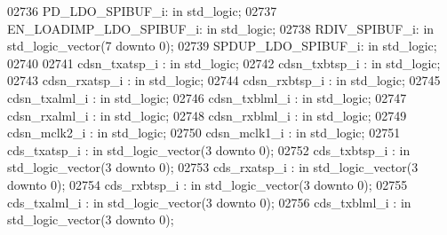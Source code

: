 \begin{DoxyCode}
02736     PD\_LDO\_SPIBUF\_i:    \textcolor{keywordflow}{in} \textcolor{comment}{std\_logic};
02737     EN\_LOADIMP\_LDO\_SPIBUF\_i:    \textcolor{keywordflow}{in} \textcolor{comment}{std\_logic};
02738     RDIV\_SPIBUF\_i:  \textcolor{keywordflow}{in} \textcolor{comment}{std\_logic\_vector}(\textcolor{vhdllogic}{}\textcolor{vhdllogic}{7} \textcolor{keywordflow}{downto} \textcolor{vhdllogic}{}\textcolor{vhdllogic}{0});
02739     SPDUP\_LDO\_SPIBUF\_i: \textcolor{keywordflow}{in} \textcolor{comment}{std\_logic};
02740     
02741     cdsn\_txatsp\_i   : \textcolor{keywordflow}{in} \textcolor{comment}{std\_logic};
02742     cdsn\_txbtsp\_i   : \textcolor{keywordflow}{in} \textcolor{comment}{std\_logic};
02743     cdsn\_rxatsp\_i   : \textcolor{keywordflow}{in} \textcolor{comment}{std\_logic};
02744     cdsn\_rxbtsp\_i   : \textcolor{keywordflow}{in} \textcolor{comment}{std\_logic};
02745     cdsn\_txalml\_i   : \textcolor{keywordflow}{in} \textcolor{comment}{std\_logic};
02746     cdsn\_txblml\_i   : \textcolor{keywordflow}{in} \textcolor{comment}{std\_logic};
02747     cdsn\_rxalml\_i   : \textcolor{keywordflow}{in} \textcolor{comment}{std\_logic};
02748     cdsn\_rxblml\_i   : \textcolor{keywordflow}{in} \textcolor{comment}{std\_logic};
02749     cdsn\_mclk2\_i    : \textcolor{keywordflow}{in} \textcolor{comment}{std\_logic};
02750     cdsn\_mclk1\_i    : \textcolor{keywordflow}{in} \textcolor{comment}{std\_logic};
02751     cds\_txatsp\_i    :   \textcolor{keywordflow}{in} \textcolor{comment}{std\_logic\_vector}(\textcolor{vhdllogic}{}\textcolor{vhdllogic}{3} \textcolor{keywordflow}{downto} \textcolor{vhdllogic}{}\textcolor{vhdllogic}{0});
02752     cds\_txbtsp\_i    :   \textcolor{keywordflow}{in} \textcolor{comment}{std\_logic\_vector}(\textcolor{vhdllogic}{}\textcolor{vhdllogic}{3} \textcolor{keywordflow}{downto} \textcolor{vhdllogic}{}\textcolor{vhdllogic}{0});
02753     cds\_rxatsp\_i    :   \textcolor{keywordflow}{in} \textcolor{comment}{std\_logic\_vector}(\textcolor{vhdllogic}{}\textcolor{vhdllogic}{3} \textcolor{keywordflow}{downto} \textcolor{vhdllogic}{}\textcolor{vhdllogic}{0});
02754     cds\_rxbtsp\_i    :   \textcolor{keywordflow}{in} \textcolor{comment}{std\_logic\_vector}(\textcolor{vhdllogic}{}\textcolor{vhdllogic}{3} \textcolor{keywordflow}{downto} \textcolor{vhdllogic}{}\textcolor{vhdllogic}{0});
02755     cds\_txalml\_i    :   \textcolor{keywordflow}{in} \textcolor{comment}{std\_logic\_vector}(\textcolor{vhdllogic}{}\textcolor{vhdllogic}{3} \textcolor{keywordflow}{downto} \textcolor{vhdllogic}{}\textcolor{vhdllogic}{0});
02756     cds\_txblml\_i    :   \textcolor{keywordflow}{in} \textcolor{comment}{std\_logic\_vector}(\textcolor{vhdllogic}{}\textcolor{vhdllogic}{3} \textcolor{keywordflow}{downto} \textcolor{vhdllogic}{}\textcolor{vhdllogic}{0});

\end{DoxyCode}
